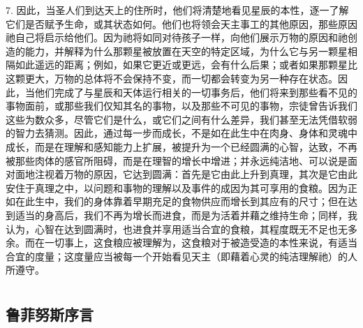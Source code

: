 7. 因此，当圣人们到达天上的住所时，他们将清楚地看见星辰的本性，逐一了解它们是否赋予生命，或其状态如何。他们也将领会天主事工的其他原因，那些原因祂自己将启示给他们。因为祂将如同对待孩子一样，向他们展示万物的原因和祂创造的能力，并解释为什么那颗星被放置在天空的特定区域，为什么它与另一颗星相隔如此遥远的距离；例如，如果它更近或更远，会有什么后果；或者如果那颗星比这颗更大，万物的总体将不会保持不变，而一切都会转变为另一种存在状态。因此，当他们完成了与星辰和天体运行相关的一切事务后，他们将来到那些看不见的事物面前，或那些我们仅知其名的事物，以及那些不可见的事物，宗徒曾告诉我们这些为数众多，尽管它们是什么，或它们之间有什么差异，我们甚至无法凭借软弱的智力去猜测。因此，通过每一步而成长，不是如在此生中在肉身、身体和灵魂中成长，而是在理解和感知能力上扩展，被提升为一个已经圆满的心智，达致，不再被那些肉体的感官所阻碍，而是在理智的增长中增进；并永远纯洁地、可以说是面对面地注视着万物的原因，它达到圆满：首先是它由此上升到真理，其次是它由此安住于真理之中，以问题和事物的理解以及事件的成因为其可享用的食粮。因为正如在此生中，我们的身体靠着早期充足的食物供应而增长到其应有的尺寸；但在达到适当的身高后，我们不再为增长而进食，而是为活着并藉之维持生命；同样，我认为，心智在达到圆满时，也进食并享用适当合宜的食粮，其程度既无不足也无多余。而在一切事上，这食粮应被理解为，这食粮对于被造受造的本性来说，有适当合宜的度量；这度量应当被每一个开始看见天主（即藉着心灵的纯洁理解祂）的人所遵守。\par



\section{}


\subsection{鲁菲努斯序言}

